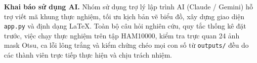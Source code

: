 \documentclass[10pt,twocolumn,a4paper]{article}
\begin{document}
\textbf{Khai báo sử dụng AI.} Nhóm sử dụng trợ lý lập trình AI (Claude / Gemini) hỗ trợ viết mã khung thực nghiệm, tối ưu kịch bản vẽ biểu đồ, xây dựng giao diện \texttt{app.py} và định dạng LaTeX. Toàn bộ câu hỏi nghiên cứu, quy tắc thống kê đặt trước, việc chạy thực nghiệm trên tập HAM10000, kiểm tra trực quan 24 ảnh mask Otsu, ca lỗi lông trắng và kiểm chứng chéo mọi con số từ \texttt{outputs/} đều do các thành viên trực tiếp thực hiện và chịu trách nhiệm.

\FloatBarrier
\begingroup
\renewcommand{\section}[2]{\subsection*{Tài liệu tham khảo}}
\footnotesize


\endgroup
\end{document}
